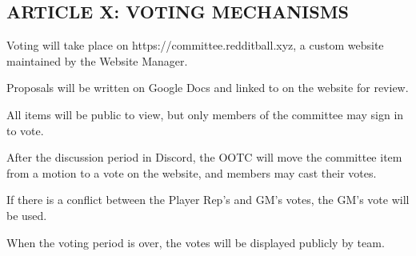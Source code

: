\subsection{ARTICLE X: VOTING MECHANISMS}
\begin{deepEnumerate}
    \item Voting will take place on https://committee.redditball.xyz, a custom website maintained by the Website Manager.
    \item Proposals will be written on Google Docs and linked to on the website for review.
    \begin{deepEnumerate}
        \item All items will be public to view, but only members of the committee may sign in to vote.
    \end{deepEnumerate}
    \item After the discussion period in Discord, the OOTC will move the committee item from a motion to a vote on the website, and members may cast their votes.
    \begin{deepEnumerate}
        \item If there is a conflict between the Player Rep's and GM's votes, the GM's vote will be used.
    \end{deepEnumerate}
    \item When the voting period is over, the votes will be displayed publicly by team.
\end{deepEnumerate}